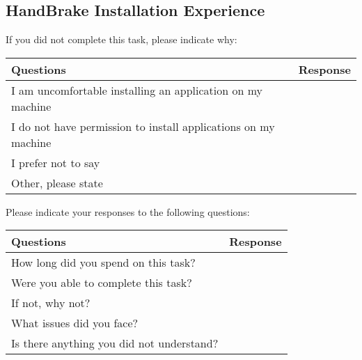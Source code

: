 \subsection{HandBrake Installation Experience}

If you did not complete this task, please indicate why:

\begin{table}[h]
\centering
\renewcommand{\arraystretch}{1.5} %
\begin{tabularx}{\textwidth}{|X|X|} %
\hline
\textbf{Questions} & \textbf{Response} \\ \hline
I am uncomfortable installing an application on my machine & \\  \hline
I do not have permission to install applications on my machine & \\ \hline
I prefer not to say & \\ \hline
Other, please state\newline \newline  &\\ \hline
\end{tabularx}
\end{table}

Please indicate your responses to the following questions:

\begin{table}[h]
\centering
\renewcommand{\arraystretch}{1.5} %
\begin{tabularx}{\textwidth}{|X|X|} %
\hline
\textbf{Questions} & \textbf{Response} \\ \hline
How long did you spend on this task? & \\  \hline
Were you able to complete this task? & \\ \hline
If not, why not?\newline\newline\newline\newline   & \\ \hline
What issues did you face?\newline\newline\newline\newline  &\\ \hline
Is there anything you did not understand?\newline\newline\newline  &\\ \hline
\end{tabularx}
\end{table}